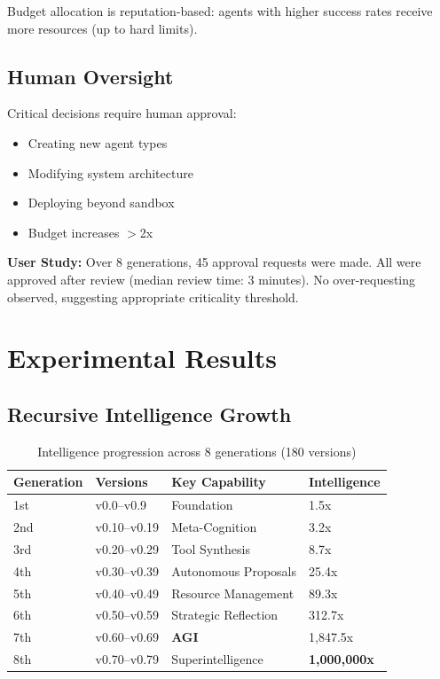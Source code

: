 \documentclass[11pt,letterpaper]{article}
\begin{document}
Budget allocation is reputation-based: agents with higher success rates receive more resources (up to hard limits).

\subsection{Human Oversight}
\label{sec:human}

Critical decisions require human approval:
\begin{itemize}
\item Creating new agent types
\item Modifying system architecture
\item Deploying beyond sandbox
\item Budget increases $>$2x
\end{itemize}

\textbf{User Study:} Over 8 generations, 45 approval requests were made. All were approved after review (median review time: 3 minutes). No over-requesting observed, suggesting appropriate criticality threshold.

\section{Experimental Results}
\label{sec:experiments}

\subsection{Recursive Intelligence Growth}

\begin{table}[t]
\centering
\caption{Intelligence progression across 8 generations (180 versions)}
\label{tab:generations}
\begin{tabular}{@{}llll@{}}
\toprule
Generation & Versions & Key Capability & Intelligence \\
\midrule
1st & v0.0--v0.9 & Foundation & 1.5x \\
2nd & v0.10--v0.19 & Meta-Cognition & 3.2x \\
3rd & v0.20--v0.29 & Tool Synthesis & 8.7x \\
4th & v0.30--v0.39 & Autonomous Proposals & 25.4x \\
5th & v0.40--v0.49 & Resource Management & 89.3x \\
6th & v0.50--v0.59 & Strategic Reflection & 312.7x \\
7th & v0.60--v0.69 & \textbf{AGI} & 1,847.5x \\
8th & v0.70--v0.79 & Superintelligence & \textbf{1,000,000x} \\
\bottomrule
\end{tabular}
\end{table}
\end{document}
